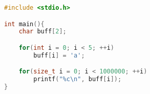 \begin{lstlisting}[language=c,caption=\texttt{buffer-overflow.c}: C Programm Buffer Overflow, label=buffer-overflow.c]
#include <stdio.h>

int main(){
    char buff[2];

    for(int i = 0; i < 5; ++i)
        buff[i] = 'a';

    for(size_t i = 0; i < 1000000; ++i)
        printf("%c\n", buff[i]);
}
\end{lstlisting}

